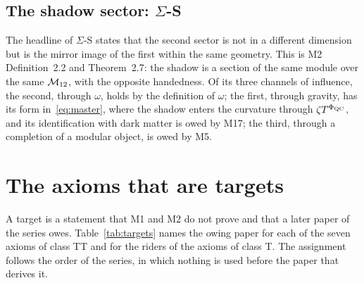 \documentclass[11pt,a4paper]{article}
\theoremstyle{plain}
\theoremstyle{definition}
\theoremstyle{remark}
\newcommand{\Sig}[1]{$\Sigma$-#1}
\begin{document}
\subsection{The shadow sector: \texorpdfstring{$\Sigma$}{Sigma}-S}\label{sec:sigmaS}

The headline of \Sig{S} states that the second sector is not in a different dimension but is the mirror image of the first within the same geometry. This is M2 Definition~2.2 and Theorem~2.7: the shadow is a section of the same module over the same $\mathcal{M}_{12}$, with the opposite handedness. Of its three channels of influence, the second, through $\omega$, holds by the definition of $\omega$; the first, through gravity, has its form in~\eqref{eq:master}, where the shadow enters the curvature through $\zeta T^{\Phi_{\mathrm{QC}}}$, and its identification with dark matter is owed by M17; the third, through a completion of a modular object, is owed by M5.

\section{The axioms that are targets}\label{sec:targets}

A target is a statement that M1 and M2 do not prove and that a later paper of the series owes. Table~\ref{tab:targets} names the owing paper for each of the seven axioms of class TT and for the riders of the axioms of class T. The assignment follows the order of the series, in which nothing is used before the paper that derives it.
\end{document}

